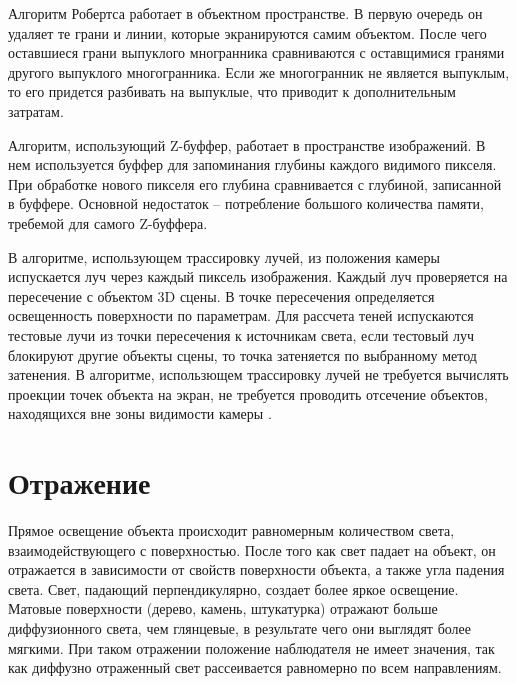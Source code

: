 Алгоритм Робертса работает в объектном пространстве. В первую очередь он удаляет те грани и линии, которые экранируются самим объектом. После чего оставшиеся грани выпуклого многранника сравниваются с оставщимися гранями другого выпуклого многогранника. Если же многогранник не является выпуклым, то его придется разбивать на выпуклые, что приводит к дополнительным затратам. 


Алгоритм, использующий Z-буффер, работает в пространстве изображений. В нем используется буффер для запоминания глубины каждого видимого пикселя. При обработке нового пикселя его глубина сравнивается с глубиной, записанной в буффере. Основной недостаток -- потребление большого количества памяти, требемой для самого Z-буффера. %



В алгоритме, использующем трассировку лучей, из положения камеры испускается луч через каждый пиксель изображения. Каждый луч проверяется на пересечение с объектом 3D сцены. В точке пересечения определяется освещенность поверхности по параметрам. Для рассчета теней испускаются тестовые лучи из точки пересечения к источникам света, если тестовый луч блокируют другие объекты сцены, то точка затеняется по выбранному метод затенения. %
В алгоритме, использющем трассировку лучей не требуется вычислять проекции точек объекта на экран, не требуется проводить отсечение объектов, находящихся вне зоны видимости камеры \cite{gabriel}.



\section{Отражение}
Прямое освещение объекта происходит равномерным количеством света, взаимодействующего с поверхностью. После того как свет падает на объект, он отражается в зависимости от свойств поверхности объекта, а также угла падения света. Свет, падающий перпендикулярно, создает более яркое освещение. Матовые поверхности (дерево, камень, штукатурка) отражают больше диффузионного света, чем глянцевые, в результате чего они выглядят более мягкими.
При таком отражении положение наблюдателя не имеет значения, так как диффузно отраженный свет рассеивается равномерно по всем направлениям.

